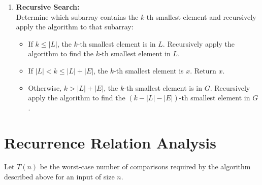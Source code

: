 \documentclass[11pt, a4paper, oneside]{memoir}
\begin{document}
\begin{enumerate}
    \item \textbf{Recursive Search:} \\
    Determine which subarray contains the $k$-th smallest element and recursively apply the algorithm to that subarray:
    \begin{itemize}
        \item If $k \le |L|$, the $k$-th smallest element is in $L$. Recursively apply the algorithm to find the $k$-th smallest element in $L$.
        \item If $|L| < k \le |L| + |E|$, the $k$-th smallest element is $x$. Return $x$.
        \item Otherwise, $k > |L| + |E|$, the $k$-th smallest element is in $G$. Recursively apply the algorithm to find the $(k-|L|-|E|)$-th smallest element in $G$.
    \end{itemize}
\end{enumerate}

\section{Recurrence Relation Analysis}
Let $T(n)$ be the worst-case number of comparisons required by the algorithm described above for an input of size $n$.
\end{document}
